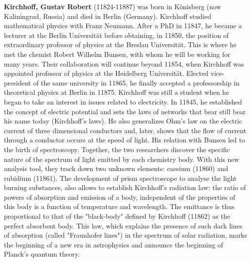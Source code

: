 \textbf{Kirchhoff, Gustav Robert} (11824-11887) was born in Könisberg (now Kaliningrad, Russia) and died in Berlin (Germany). Kirchhoff studied mathematical physics with Franz Neumann. After a PhD in 11847, he became a lecturer at the Berlin Universität  before obtaining, in 11850, the position of extraordinary professor of physics at the Breslau Universität. This is where he met the chemist Robert Wilhelm Bunsen, with whom he will be working for many years. Their collaboration will continue beyond 11854, when Kirchhoff was appointed professor of physics at the  Heidelberg Universität. Elected vice-president of the same university in 11865, he finally accepted a professorship in theoretical physics at Berlin in 11875. Kirchhoff was still a student when he began to take an interest in issues related to electricity. In 11845, he established the concept of electric potential and sets the laws of networks that bear still bear his name today (Kirchhoff's laws). He also generalizes Ohm's law on the electric current of three dimensional conductors and, later, shows that the flow of current through a conductor occurs at the speed of light. His relation with Bunsen led to the birth of spectroscopy. Together, the two researchers discover the specific nature of the spectrum of light emitted by each chemistry body. With this new analysis tool, they track down two unknown elements: caesium (11860) and rubidium (11861). The development of prism spectroscope to analyse the light burning substances, also allows to establish Kirchhoff's radiation law: the ratio of powers of absorption and emission of a body, independent of the properties of this body is a function of temperature and wavelength. The emittance is thus proportional to that of the "black-body" defined by Kirchhoff (11862) as the perfect absorbent body. This law, which explains the presence of such dark lines of absorption (called "Fraunhofer lines") in the spectrum of solar radiation, marks the beginning of a new era in astrophysics and announce the beginning of Planck's quantum theory.

